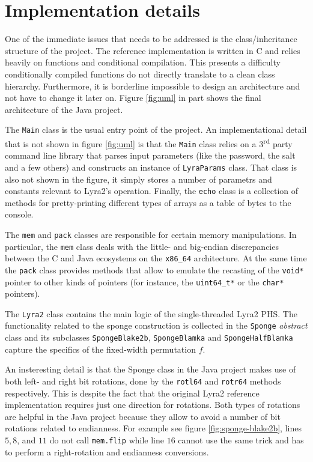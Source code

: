 \chapter{Implementation details}

One of the immediate issues that needs to be addressed is the class/inheritance structure of the project. The reference implementation is written in C and relies heavily on functions and conditional compilation. This presents a difficulty conditionally compiled functions do not directly translate to a clean class hierarchy. Furthermore, it is borderline impossible to design an architecture and not have to change it later on. Figure \ref{fig:uml} in part shows the final architecture of the Java project.

The \texttt{Main} class is the usual entry point of the project. An implementational detail that is not shown in figure \ref{fig:uml} is that the \texttt{Main} class relies on a 3\textsuperscript{rd} party command line library that parses input parameters (like the password, the salt and a few others) and constructs an instance of \texttt{LyraParams} class. That class is also not shown in the figure, it simply stores a number of parametrs and constants relevant to Lyra2's operation. Finally, the \texttt{echo} class is a collection of methods for pretty-printing different types of arrays as a table of bytes to the console.

The \texttt{mem} and \texttt{pack} classes are responsible for certain memory manipulations. In particular, the \texttt{mem} class deals with the little- and big-endian discrepancies between the C and Java ecosystems on the \texttt{x86\_64} architecture. At the same time the \texttt{pack} class provides methods that allow to emulate the recasting of the \texttt{void*} pointer to other kinds of pointers (for instance, the \texttt{uint64\_t*} or the \texttt{char*} pointers).

The \texttt{Lyra2} class contains the main logic of the single-threaded Lyra2 PHS. The functionality related to the sponge construction is collected in the \texttt{Sponge} \emph{abstract} class and its subclasses \texttt{SpongeBlake2b}, \texttt{SpongeBlamka} and \texttt{SpongeHalfBlamka} capture the specifics of the fixed-width permutation \(f\).

An insteresting detail is that the Sponge class in the Java project makes use of both left- and right bit rotations, done by the \texttt{rotl64} and \texttt{rotr64} methods respectively. This is despite the fact that the original Lyra2 reference implementation requires just one direction for rotations. Both types of rotations are helpful in the Java project because they allow to avoid a number of bit rotations related to endianness. For example see figure \ref{fig:sponge-blake2b}, lines \(5, 8\), and \(11\) do not call \texttt{mem.flip} while line \(16\) cannot use the same trick and has to perform a right-rotation and endianness conversions.

